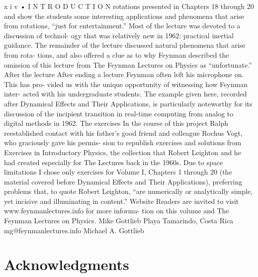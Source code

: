 \documentclass[11pt,oneside]{article}
\begin{document}
x i v • I N T R O D U C T I O N rotations presented in Chapters 18 through 20 and show the students some interesting applications and phenomena that arise from rotations, “just for entertainment.” Most of the lecture was devoted to a discussion of technol- ogy that was relatively new in 1962: practical inertial guidance. The remainder of the lecture discussed natural phenomena that arise from rota- tions, and also offered a clue as to why Feynman described the omission of this lecture from The Feynman Lectures on Physics as “unfortunate.” After the lecture After ending a lecture Feynman often left his microphone on. This has pro- vided us with the unique opportunity of witnessing how Feynman inter- acted with his undergraduate students. The example given here, recorded after Dynamical Effects and Their Applications, is particularly noteworthy for its discussion of the incipient transition in real-time computing from analog to digital methods in 1962. The exercises In the course of this project Ralph reestablished contact with his father’s good friend and colleague Rochus Vogt, who graciously gave his permis- sion to republish exercises and solutions from Exercises in Introductory Physics, the collection that Robert Leighton and he had created especially for The Lectures back in the 1960s. Due to space limitations I chose only exercises for Volume I, Chapters 1 through 20 (the material covered before Dynamical Effects and Their Applications), preferring problems that, to quote Robert Leighton, “are numerically or analytically simple, yet incisive and illuminating in content.” Website Readers are invited to visit www.feynmanlectures.info for more informa- tion on this volume and The Feynman Lectures on Physics. Mike Gottlieb Playa Tamarindo, Costa Rica mg@feynmanlectures.info Michael A. Gottlieb\par



\clearpage


\section*{Acknowledgments}



\label{tips-sec-4-acknowledgments}

\end{document}

